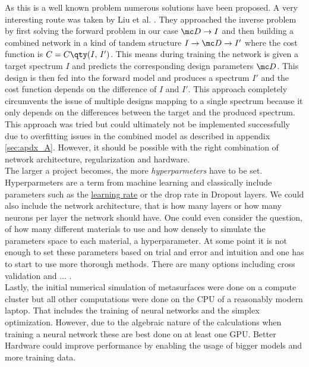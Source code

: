 \indent As this is a well known problem numerous solutions have been proposed. A very interesting route was taken by Liu et al. \cite{Liu2018}. They approached the inverse problem by first solving the forward problem in our case $\mc D \rightarrow I$ and then building a combined network in a kind of tandem structure 
$I \rightarrow \mc D \rightarrow I'$
where the cost function is 
$C = C \qty(I, \, I')$.
This means during training the network is given a target spectrum $I$ and predicts the corresponding design parameters $\mc D$. This design is then fed into the forward model and produces a spectrum $I'$ and the cost function depends on the difference of $I$ and $I'$. This approach completely circumvents the issue of multiple designs mapping to a single spectrum because it only depends on the differences between the target and the produced spectrum. This approach was tried but could ultimately not be implemented successfully due to overfitting issues in the combined model as described in appendix \ref{sec:apdx_A}. However, it should be possible with the right combination of network architecture, regularization and hardware.
\\    

\indent
The larger a project becomes, the more \textit{hyperparmeters} have to be set. Hyperparmeters are a term from machine learning and classically include parameters such as the \hyperref[hyp:learnigrate]{learning rate} or the drop rate in Dropout layers. We could also include the network architecture, that is how many layers or how many neurons per layer the network should have. One could even consider the question, of how many different materials to use and how densely to simulate the parameters space to each material, a hyperparameter.
At some point it is not enough to set these parameters based on trial and error and intuition and one has to start to use more thorough methods. There are many options including cross validation  and ... .
\\

\indent
Lastly, the initial numerical simulation of metasurfaces were done on a compute cluster but all other computations were done on the CPU of a reasonably modern laptop. That includes the training of neural networks and the simplex optimization. However, due to the algebraic nature of the calculations when training a neural network these are best done on at least one GPU. Better Hardware could improve performance by enabling the usage of bigger models and more training data. 
\\

\indent

